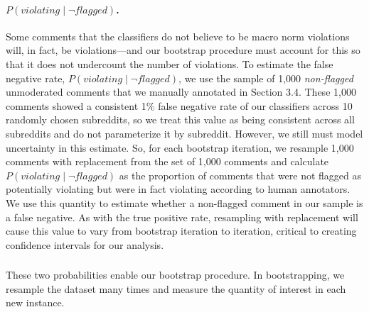 \paragraph{$P(violating \mid \lnot flagged)$.} Some comments that the classifiers do not believe to be macro norm violations will, in fact, be violations---and our bootstrap procedure must account for this so that it does not undercount the number of violations. To estimate the false negative rate, $P(violating \mid \lnot flagged)$, we use the sample of 1,000 \textit{non-flagged} unmoderated comments that we manually annotated in Section 3.4. These 1,000 comments showed a consistent 1\% false negative rate of our classifiers across 10 randomly chosen subreddits, so we treat this value as being consistent across all subreddits and do not parameterize it by subreddit. However, we still must model uncertainty in this estimate. So, for each bootstrap iteration, we resample 1,000 comments with replacement from the set of 1,000 comments and calculate $P(violating \mid \lnot flagged)$ as the proportion of comments that were not flagged as potentially violating but were in fact violating according to human annotators. We use this quantity to estimate whether a non-flagged comment in our sample is a false negative. As with the true positive rate, resampling with replacement will cause this value to vary from bootstrap iteration to iteration, critical to creating confidence intervals for our analysis.

\subsubsection{}
These two probabilities enable our bootstrap procedure. In bootstrapping, we resample the dataset many times and measure the quantity of interest in each new instance. 


